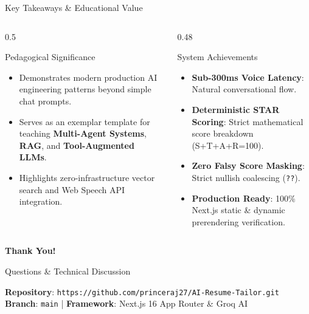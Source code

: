 \documentclass[aspectratio=169, 10pt]{beamer}
\begin{document}
\begin{frame}{Key Takeaways \& Educational Value}
  \begin{columns}
    \begin{column}{0.5\textwidth}
      \begin{block}{Pedagogical Significance}
        \small
        \begin{itemize}
          \item Demonstrates modern production AI engineering patterns beyond simple chat prompts.
          \item Serves as an exemplar template for teaching \textbf{Multi-Agent Systems}, \textbf{RAG}, and \textbf{Tool-Augmented LLMs}.
          \item Highlights zero-infrastructure vector search and Web Speech API integration.
        \end{itemize}
      \end{block}
    \end{column}

    \begin{column}{0.48\textwidth}
      \begin{block}{System Achievements}
        \small
        \begin{itemize}
          \item \textbf{Sub-300ms Voice Latency}: Natural conversational flow.
          \item \textbf{Deterministic STAR Scoring}: Strict mathematical score breakdown (S+T+A+R=100).
          \item \textbf{Zero Falsy Score Masking}: Strict nullish coalescing (\texttt{??}).
          \item \textbf{Production Ready}: 100\% Next.js static & dynamic prerendering verification.
        \end{itemize}
      \end{block}
    \end{column}
  \end{columns}
\end{frame}

\begin{frame}
  \centering
  \vspace{1cm}
  \Huge \textbf{\alert{Thank You!}}
  
  \vspace{0.5cm}
  \Large Questions \& Technical Discussion
  
  \vspace{1cm}
  \small
  \textbf{Repository}: \texttt{https://github.com/princeraj27/AI-Resume-Tailor.git} \\
  \textbf{Branch}: \texttt{main} \quad | \quad \textbf{Framework}: Next.js 16 App Router \& Groq AI
\end{frame}
\end{document}
